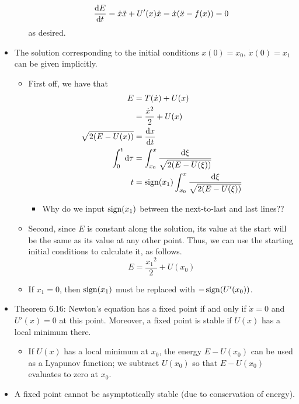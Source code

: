 \documentclass[../notes.tex]{subfiles}
\begin{document}
\begin{itemize}
\begin{itemize}
        \begin{equation*}
            \dv{E}{t} = \dot{x}\ddot{x}+U'(x)\dot{x}
            = \dot{x}(\ddot{x}-f(x))
            = 0
        \end{equation*}
        as desired.
    \end{itemize}
    \item The solution corresponding to the initial conditions $x(0)=x_0$, $\dot{x}(0)=x_1$ can be given implicitly.
    \begin{itemize}
        \item First off, we have that
        \begin{align*}
            E &= T(\dot{x})+U(x)\\
            &= \frac{\dot{x}^2}{2}+U(x)\\
            \sqrt{2(E-U(x))} &= \dv{x}{t}\\
            \int_0^t\dd\tau &= \int_{x_0}^x\frac{\dd\xi}{\sqrt{2(E-U(\xi))}}\\
            t &= \operatorname{sign}(x_1)\int_{x_0}^x\frac{\dd\xi}{\sqrt{2(E-U(\xi))}}
        \end{align*}
        \begin{itemize}
            \item Why do we input $\operatorname{sign}(x_1)$ between the next-to-last and last lines??
        \end{itemize}
        \item Second, since $E$ is constant along the solution, its value at the start will be the same as its value at any other point. Thus, we can use the starting initial conditions to calculate it, as follows.
        \begin{equation*}
            E = \frac{{x_1}^2}{2}+U(x_0)
        \end{equation*}
        \item If $x_1=0$, then $\operatorname{sign}(x_1)$ must be replaced with $-\operatorname{sign}(U'(x_0))$.
    \end{itemize}
    \item Theorem 6.16: Newton's equation has a fixed point if and only if $\dot{x}=0$ and $U'(x)=0$ at this point. Moreover, a fixed point is stable if $U(x)$ has a local minimum there.
    \begin{itemize}
        \item If $U(x)$ has a local minimum at $x_0$, the energy $E-U(x_0)$ can be used as a Lyapunov function; we subtract $U(x_0)$ so that $E-U(x_0)$ evaluates to zero at $x_0$.
    \end{itemize}
    \item A fixed point cannot be asymptotically stable (due to conservation of energy).

\end{itemize}
\end{document}
